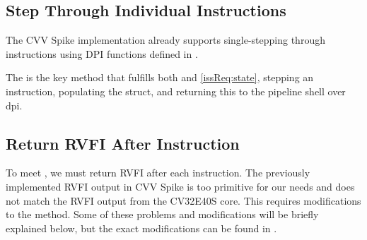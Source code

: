 \subsection{Step Through Individual Instructions}%

The CVV Spike implementation already supports single-stepping through instructions using DPI functions defined in  \cite{CorevverifVendorRiscv}.

The  is the key method that fulfills both  and \ref{issReq:state}, stepping an instruction, populating the  struct, and returning this to the pipeline shell over \acrshort{dpi}. 

\subsection{Return RVFI After Instruction}%


To meet , we must return RVFI after each instruction. The previously implemented RVFI output in CVV Spike is too primitive for our needs and does not match the RVFI output from the CV32E40S core. This requires modifications to the  method. Some of these problems and modifications will be briefly explained below, but the exact modifications can be found in .



